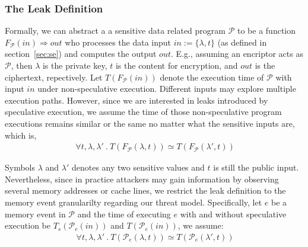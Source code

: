 \documentclass[sigconf, review]{acmart}
\newcommand{\prog}{\mathcal{P}}
\begin{document}
\subsubsection{The Leak Definition}

Formally, we can abstract a a sensitive data related program $\prog$ to be a 
function $\mathit{F_{\prog}(in)\Rightarrow out}$ who processes the data input 
$\mathit{in}:=\{\lambda,t\}$ (as defined in section~\ref{sec:se}) and computes 
the output $\mathit{out}$. E.g., assuming an encriptor acts as $\prog$, then 
$\lambda$ is the private key, $t$ is the content for encryption, and $out$ is 
the ciphertext, repectively. Let $T(F_{\prog}(in))$ denote the execution time 
of $\prog$ with input $\mathit{in}$ under non-speculative execution. Different
inputs may explore multiple execution paths. However, since we are interested 
in leaks introduced by speculative execution, we assume the time of those 
non-speculative program executions remains similar or the same no matter what 
the sensitive inputs are, which is, 
%
\begin{multline} 
  \label{lb:no_leak_event}
  ~~~~~\mathit{\forall t,\lambda,\lambda'~.~T(F_{\prog}(\lambda,t)) \simeq 
  T(F_{\prog}(\lambda',t))}~~~~
\end{multline} 
%

Symbols $\lambda$ and $\lambda'$ denotes any two sensitive values and $t$ is 
still the public input. Nevertheless, since in practice attackers may gain 
information by observing several memory addresses or cache lines, we restrict 
the leak definition to the memory event granularilty regarding our threat model. 
Specifically, let $\mathit{e}$ be a memory event in $\prog$ and the time of 
executing $\mathit{e}$ with and without speculative execution be 
$\mathit{T_{s}(\prog_e(in))}$ and $\mathit{T(\prog_e(in))}$, we assume:
%
\begin{multline} 
  \label{lb:no_leak_event}
  ~~~~~\mathit{\forall t,\lambda,\lambda'~.~T(\prog_e(\lambda,t)) \simeq 
  T(\prog_e(\lambda',t))}~~~~
\end{multline} 
%
\end{document}
